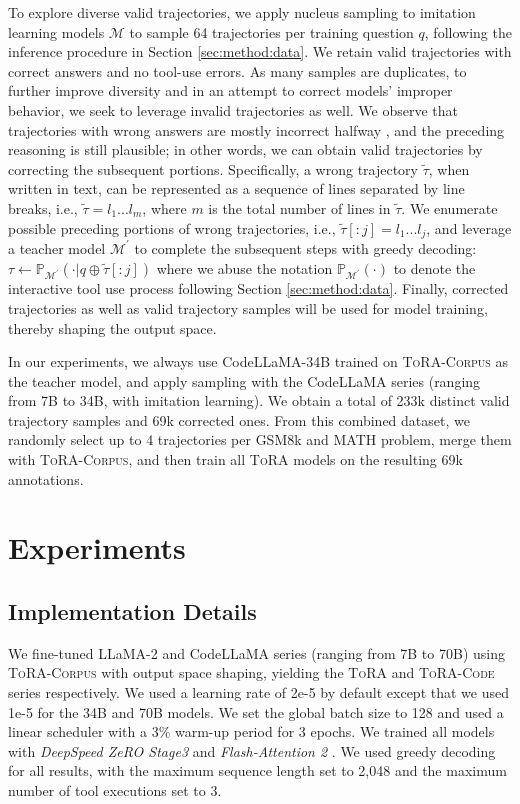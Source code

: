 To explore diverse valid trajectories, we apply nucleus sampling to imitation learning models $\mathcal{M}$ to sample 64 trajectories per training question $q$, following the inference procedure in Section \ref{sec:method:data}.
We retain valid trajectories with correct answers and no tool-use errors. As many samples are duplicates, to further improve diversity and in an attempt to correct models' improper behavior, we seek to leverage invalid trajectories as well. We observe that trajectories with wrong answers are mostly incorrect halfway \citep{li2023making}, and the preceding reasoning is still plausible; in other words, we can obtain valid trajectories by correcting the subsequent portions. Specifically, a wrong trajectory $\widetilde{\tau}$, when written in text, can be represented as a sequence of lines separated by line breaks, i.e., $\widetilde{\tau} = l_1...l_{m}$, where $m$ is the total number of lines in $\widetilde{\tau}$.
We enumerate possible preceding portions of wrong trajectories, i.e., $\widetilde{\tau}[:j] = l_1...l_j$, and leverage a teacher model $\mathcal{M}^\prime$ to complete the subsequent steps with greedy decoding:
$\tau \leftarrow \mathbb{P}_{\mathcal{M}^\prime}(\cdot | q \oplus \widetilde{\tau}[:j])$ where we abuse the notation $\mathbb{P}_{\mathcal{M}^\prime}(\cdot)$ to denote the interactive tool use process following Section \ref{sec:method:data}.
Finally, corrected trajectories as well as valid trajectory samples will be used for model training, thereby shaping the output space.

In our experiments, we always use CodeLLaMA-34B trained on \textsc{ToRA-Corpus} as the teacher model, and apply sampling with the CodeLLaMA series (ranging from 7B to 34B, with imitation learning). We obtain a total of 233k distinct valid trajectory samples and 69k corrected ones. From this combined dataset, we randomly select up to 4 trajectories per GSM8k and MATH problem, merge them with \textsc{ToRA-Corpus}, and then train all \textsc{ToRA} models on the resulting 69k annotations.

\section{Experiments}
\subsection{Implementation Details}

We fine-tuned LLaMA-2 \citep{llama2} and CodeLLaMA \citep{roziere2023code} series (ranging from 7B to 70B) using \textsc{ToRA-Corpus} with output space shaping, yielding the \textsc{ToRA} and \textsc{ToRA-Code} series respectively. We used a learning rate of 2e-5 by default except that we used 1e-5 for the 34B and 70B models. We set the global batch size to 128 and used a linear scheduler with a 3\% warm-up period for 3 epochs. We trained all models with \textit{DeepSpeed ZeRO Stage3} \citep{rajbhandari2021zero} and \textit{Flash-Attention 2} \citep{dao2023flashattention2}. We used greedy decoding for all results, with the maximum sequence length set to 2,048 and the maximum number of tool executions set to 3.


